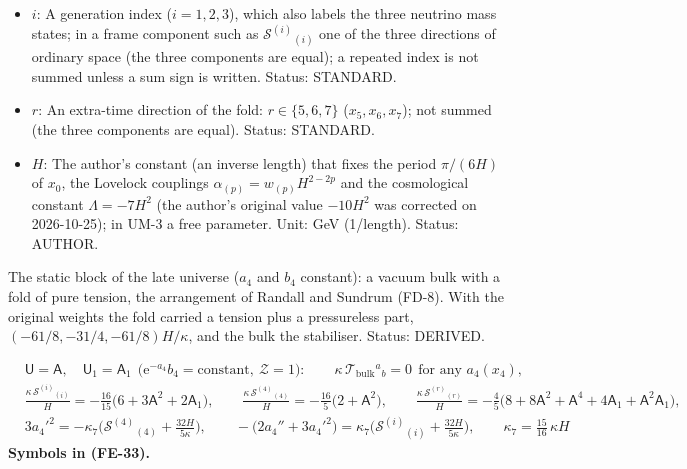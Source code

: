 \documentclass[
  10pt,
]{article}
\begin{document}
\begin{itemize}
  energy density, \(\mathcal{S}^1{}_1\) and \(\mathcal{S}^5{}_5\) its
  pressures along ordinary space and along the extra times (frame
  components along the fold, eight-dimensional normalisation: an energy
  per unit volume of the six other directions of the fold). Unit:
  GeV\(^7\). Value:
  \(\kappa\mathcal{S}^a{}_b = -\frac{32}{5}H\delta^a{}_b\) at the static
  block. Status: DERIVED.
\item
  \(i\): A generation index (\(i = 1, 2, 3\)), which also labels the
  three neutrino mass states; in a frame component such as
  \(\mathcal{S}^{(i)}{}_{(i)}\) one of the three directions of ordinary
  space (the three components are equal); a repeated index is not summed
  unless a sum sign is written. Status: STANDARD.
\item
  \(r\): An extra-time direction of the fold: \(r \in \{5, 6, 7\}\)
  (\(x_5, x_6, x_7\)); not summed (the three components are equal).
  Status: STANDARD.
\item
  \(H\): The author's constant (an inverse length) that fixes the period
  \(\pi/(6H)\) of \(x_0\), the Lovelock couplings
  \(\alpha_{(p)} = w_{(p)}H^{2-2p}\) and the cosmological constant
  \(\Lambda = -7H^2\) (the author's original value \(-10H^2\) was
  corrected on 2026-10-25); in UM-3 a free parameter. Unit: GeV
  (1/length). Status: AUTHOR.
\end{itemize}

The static block of the late universe (\(a_4\) and \(b_4\) constant): a
vacuum bulk with a fold of pure tension, the arrangement of Randall and
Sundrum (FD-8). With the original weights the fold carried a tension
plus a pressureless part, \((-61/8, -31/4, -61/8)H/\kappa\), and the
bulk the stabiliser. Status: DERIVED.

\[
\begin{aligned}
&\mathsf{U} = \mathsf{A},\quad \mathsf{U}_1 = \mathsf{A}_1\ \ \big(\mathrm{e}^{-a_4}b_4 = \text{constant},\ \mathcal{Z} = 1\big):\qquad
 \kappa\,\mathcal{T}_{\mathrm{bulk}}{}^a{}_b = 0\ \ \text{for any } a_4(x_4),\\
&\frac{\kappa\,\mathcal{S}^{(i)}{}_{(i)}}{H} = -\frac{16}{15}\big(6 + 3\mathsf{A}^2 + 2\mathsf{A}_1\big),\qquad
 \frac{\kappa\,\mathcal{S}^{(4)}{}_{(4)}}{H} = -\frac{16}{5}\big(2 + \mathsf{A}^2\big),\qquad
 \frac{\kappa\,\mathcal{S}^{(r)}{}_{(r)}}{H} = -\frac45\big(8 + 8\mathsf{A}^2 + \mathsf{A}^4 + 4\mathsf{A}_1 + \mathsf{A}^2\mathsf{A}_1\big),\\
&3a_4'^2 = -\kappa_7\Big(\mathcal{S}^{(4)}{}_{(4)} + \frac{32H}{5\kappa}\Big),\qquad
 -\big(2a_4'' + 3a_4'^2\big) = \kappa_7\Big(\mathcal{S}^{(i)}{}_{(i)} + \frac{32H}{5\kappa}\Big),\qquad \kappa_7 = \frac{15}{16}\,\kappa H
\end{aligned} \tag{FE-33}
\] \textbf{Symbols in (FE-33).}
\end{document}
